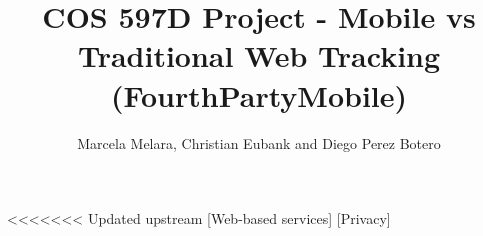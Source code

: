 \documentclass{acm_proc_article-sp}
\begin{document}
\newcommand{\pp}{privacy policy}
\newcommand{\pps}{privacy policies}
\newcommand{\fpm}{FourthPartyMobile}

\title{COS 597D Project - Mobile vs Traditional Web Tracking\\(FourthPartyMobile)}
%
%
%
%
%

%
\author{
%
%
\alignauthor
Marcela Melara, Christian Eubank and Diego Perez Botero \\ 
}

\maketitle

<<<<<<< Updated upstream
[Web-based services]
[Privacy]
\end{document}
